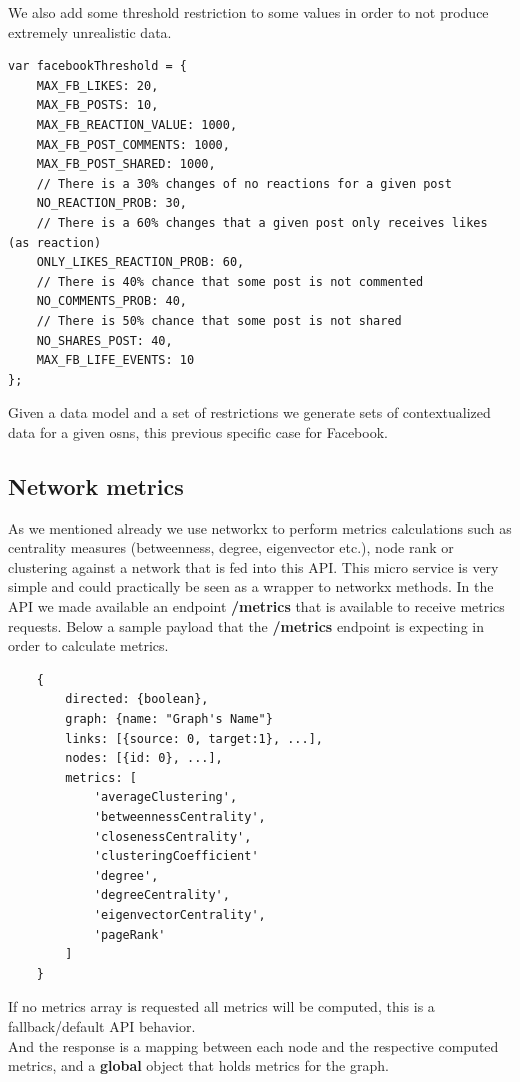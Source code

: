 We also add some threshold restriction to some values in order to not produce extremely unrealistic data.

\begin{verbatim}
var facebookThreshold = {
    MAX_FB_LIKES: 20,
    MAX_FB_POSTS: 10,
    MAX_FB_REACTION_VALUE: 1000,
    MAX_FB_POST_COMMENTS: 1000,
    MAX_FB_POST_SHARED: 1000,
    // There is a 30% changes of no reactions for a given post
    NO_REACTION_PROB: 30,
    // There is a 60% changes that a given post only receives likes (as reaction)
    ONLY_LIKES_REACTION_PROB: 60,
    // There is 40% chance that some post is not commented
    NO_COMMENTS_PROB: 40,
    // There is 50% chance that some post is not shared
    NO_SHARES_POST: 40,
    MAX_FB_LIFE_EVENTS: 10
};
\end{verbatim}

Given a data model and a set of restrictions we generate sets of contextualized data for a given \glspl{osn}, this previous specific case for Facebook.

\subsection{Network metrics}
As we mentioned already we use networkx \cite{hagberg2013networkx} to perform metrics calculations such as centrality measures (betweenness, degree, eigenvector etc.), node rank or clustering against a network that is fed into this API. This micro service is very simple and could practically be seen as a wrapper to networkx methods. In the API we made available an endpoint \textbf{/metrics} that is available to receive metrics requests. Below a sample payload that the \textbf{/metrics} endpoint is expecting in order to calculate metrics.

\begin{verbatim}
    {
        directed: {boolean},
        graph: {name: "Graph's Name"}
        links: [{source: 0, target:1}, ...],
        nodes: [{id: 0}, ...],
        metrics: [
            'averageClustering',
            'betweennessCentrality',
            'closenessCentrality',
            'clusteringCoefficient'
            'degree',
            'degreeCentrality',
            'eigenvectorCentrality',
            'pageRank'
        ]
    }
\end{verbatim}

If no metrics array is requested all metrics will be computed, this is a fallback/default API behavior.\\
\indent And the response is a mapping between each node and the respective computed metrics, and a \textbf{global} object that holds metrics for the graph.

